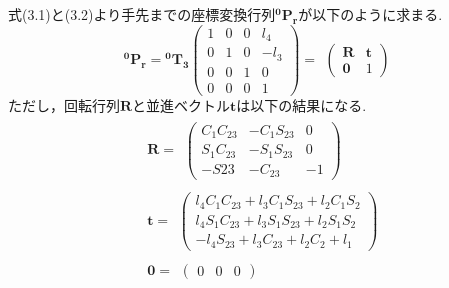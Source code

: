 	式(3.1)と(3.2)より手先までの座標変換行列$\boldsymbol{ ^{0}P_{r} }$が以下のように求まる.
	\begin{equation*}
		\boldsymbol{ ^{0}P_{r} } =
		\boldsymbol{^{0}T_{3}}
		\left(
		\begin{array}{cccc}
			1 & 0 & 0 & l_4\\
			0 & 1 & 0 & -l_3\\
			0 & 0 & 1 & 0\\
			0 & 0 & 0 & 1
		\end{array}
		\right)=
		\begin{array}{cc}
			\left(
				\begin{array}{cc}
					\boldsymbol{R} & \boldsymbol{t} \\
					\boldsymbol{0} & 1
				\end{array}
			\right)
		\end{array}
	\end{equation*}
	ただし，回転行列$\boldsymbol{R}$と並進ベクトル$\boldsymbol{t}$は以下の結果になる.
	\begin{equation*}
	\begin{split}
		&\boldsymbol{R} =
		\begin{array}{cc}
			\left(
				\begin{array}{ccc}
					C_1C_{23} & -C_1S_{23} & 0 \\
					S_1C_{23} & -S_1S_{23} & 0 \\
					-S{23} & -C_{23} & -1
				\end{array}
			\right)
		\end{array} \\
		&\boldsymbol{t} =
		\begin{array}{cc}
			\left(
				\begin{array}{c}
					l_4C_1C_{23}+l_3C_1S_{23}+l_2C_1S_2 \\
					l_4S_1C_{23}+l_3S_1S_{23}+l_2S_1S_2 \\
				-l_4S_{23}+l_3C_{23}+l_2C_2+l_1
				\end{array}
			\right)
		\end{array}\\
		&\boldsymbol{0} =
		\begin{array}{cc}
			\left(
				\begin{array}{ccc}
					0 & 0 & 0
				\end{array}
			\right)
		\end{array}
	\end{split}
	\end{equation*}

